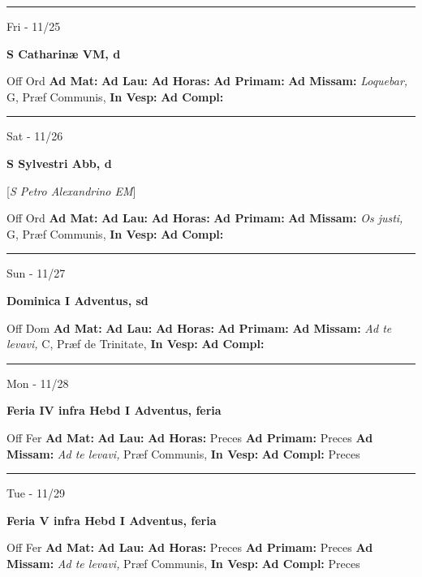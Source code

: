 \documentclass[letterpaper, 10pt]{article}
\begin{document}
\hrule
\begin{center}
Fri - 11/25
\end{center}\textbf{ \large S Catharinæ VM, \textnormal{\normalsize d}}
\begin{justify}
Off Ord
\textbf{Ad Mat: }
\textbf{Ad Lau: }
\textbf{Ad Horas: }
\textbf{Ad Primam: }
\textbf{Ad Missam:} \textit{Loquebar, } G, Præf Communis, 
\textbf{In Vesp: }
\textbf{Ad Compl: }\end{justify}



\hrule
\begin{center}
Sat - 11/26
\end{center}\textbf{ \large S Sylvestri Abb, \textnormal{\normalsize d}}

[\textit{S Petro Alexandrino EM}]
\begin{justify}
Off Ord
\textbf{Ad Mat: }
\textbf{Ad Lau: }
\textbf{Ad Horas: }
\textbf{Ad Primam: }
\textbf{Ad Missam:} \textit{Os justi, } G, Præf Communis, 
\textbf{In Vesp: }
\textbf{Ad Compl: }\end{justify}



\hrule
\begin{center}
Sun - 11/27
\end{center}\textbf{ \large Dominica I Adventus, \textnormal{\normalsize sd}}
\begin{justify}
Off Dom
\textbf{Ad Mat: }
\textbf{Ad Lau: }
\textbf{Ad Horas: }
\textbf{Ad Primam: }
\textbf{Ad Missam:} \textit{Ad te levavi, } C, Præf de Trinitate, 
\textbf{In Vesp: }
\textbf{Ad Compl: }\end{justify}



\hrule
\begin{center}
Mon - 11/28
\end{center}\textbf{ \large Feria IV infra Hebd I Adventus, \textnormal{\normalsize feria}}
\begin{justify}
Off Fer
\textbf{Ad Mat: }
\textbf{Ad Lau: }
\textbf{Ad Horas: }Preces
\textbf{Ad Primam: }Preces
\textbf{Ad Missam:} \textit{Ad te levavi, } Præf Communis, 
\textbf{In Vesp: }
\textbf{Ad Compl: }Preces\end{justify}



\hrule
\begin{center}
Tue - 11/29
\end{center}\textbf{ \large Feria V infra Hebd I Adventus, \textnormal{\normalsize feria}}
\begin{justify}
Off Fer
\textbf{Ad Mat: }
\textbf{Ad Lau: }
\textbf{Ad Horas: }Preces
\textbf{Ad Primam: }Preces
\textbf{Ad Missam:} \textit{Ad te levavi, } Præf Communis, 
\textbf{In Vesp: }
\textbf{Ad Compl: }Preces\end{justify}
\end{document}
